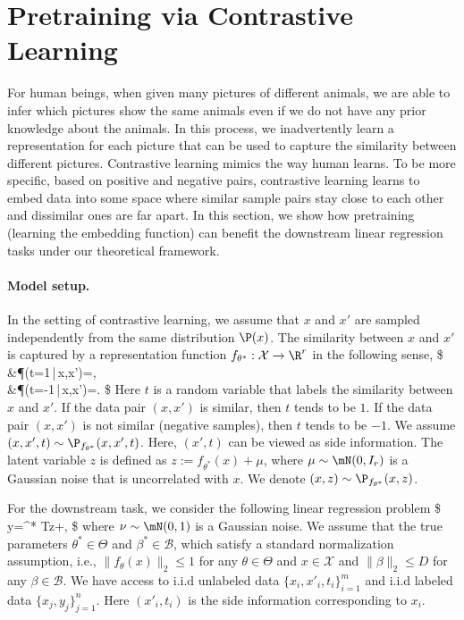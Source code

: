 \section{Pretraining via Contrastive Learning}\label{contrastive_learning}


For human beings, when given many pictures of different animals, we are able to infer which pictures show the same animals even if we do not have any prior knowledge about the animals. In this process, we inadvertently learn a representation for each picture that can be used to capture the similarity between different pictures. Contrastive learning mimics the way human learns. To be more specific, based on positive and negative pairs, contrastive learning learns to embed data into some space where similar sample pairs stay close to each other and dissimilar ones are far apart. In this section, we show how pretraining (learning the embedding function) can benefit the downstream linear regression tasks under our theoretical framework.


\paragraph{Model setup.}
In the setting of contrastive learning, we assume that $x$ and $x'$ are sampled independently from the same distribution $\P(x)$. The similarity between $x$ and $x'$ is captured by a representation function $f_{\theta^* }:\mathcal{X}\rightarrow \R^{r}$ in the following sense, 
\$
&\P(t=1\,|\,x,x')=,\notag\\
&\P(t=-1\,|\,x,x')=.
\$
Here $t$ is a random variable that labels the similarity between $x$ and $x'$. If the data pair $(x,x')$ is similar, then $t$ tends to be $1$. If the data pair $(x,x')$ is not similar (negative samples), then $t$ tends to be $-1$. We assume $(x,x',t)\sim\P_{f_{\theta^* }}(x,x',t)$. Here, $(x',t)$ can be viewed as side information. The latent variable $z$ is defined as $z:=f_{\theta^* }(x)+\mu$, where $\mu\sim\mN(0,I_r)$ is a Gaussian noise that is uncorrelated with $x$. We denote $(x,z)\sim\P_{f_{\theta^* }}(x,z)$.


For the downstream task, we consider the following linear regression problem
\$
y=\beta^{* T}z+\nu,
\$
where $\nu\sim\mN(0,1)$ is a Gaussian noise. We assume that the true parameters $\theta^* \in\Theta$ and $\beta^* \in\mathcal{B}$, which satisfy a standard normalization assumption, i.e., $\|f_{\theta}(x)\|_2\leq 1$ for any $\theta\in\Theta$ and $x\in\mathcal{X}$ and $\|\beta\|_2\leq D$ for any $\beta\in\mathcal{B}$. We have access to i.i.d unlabeled data $\{x_i,x'_i,t_i\}^{m}_{i=1}$ and i.i.d labeled data $\{x_j,y_j\}^n_{j=1}$. Here $(x'_i,t_i)$ is the side information corresponding to $x_i$.

